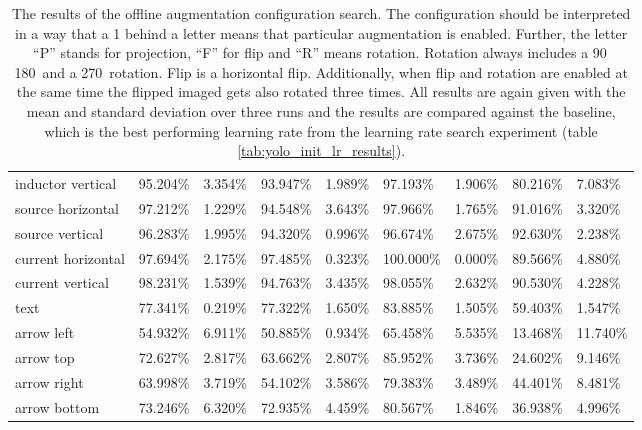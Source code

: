 \begin{table}[H]
\begin{center}
\begin{tabular}{|l|l|l|l|l|l|l|l|l|}
inductor vertical               & 95.204\% & 3.354\%  & 93.947\% & 1.989\%  &  97.193\%  & 1.906\% & 80.216\% & 7.083\%  \\
\rowcolor{lightgray!50}
source horizontal               & 97.212\% & 1.229\%  & 94.548\% & 3.643\%  &  97.966\%  & 1.765\% & 91.016\% & 3.320\%  \\
source vertical                 & 96.283\% & 1.995\%  & 94.320\% & 0.996\%  &  96.674\%  & 2.675\% & 92.630\% & 2.238\%  \\
\rowcolor{lightgray!50}
current horizontal              & 97.694\% & 2.175\%  & 97.485\% & 0.323\%  &  100.000\% & 0.000\% & 89.566\% & 4.880\%  \\
current vertical                & 98.231\% & 1.539\%  & 94.763\% & 3.435\%  &  98.055\%  & 2.632\% & 90.530\% & 4.228\%  \\
\rowcolor{lightgray!50}
text                            & 77.341\% & 0.219\%  & 77.322\% & 1.650\%  &  83.885\%  & 1.505\% & 59.403\% & 1.547\%  \\
arrow left                      & 54.932\% & 6.911\%  & 50.885\% & 0.934\%  &  65.458\%  & 5.535\% & 13.468\% & 11.740\% \\
\rowcolor{lightgray!50}
arrow top                       & 72.627\% & 2.817\%  & 63.662\% & 2.807\%  &  85.952\%  & 3.736\% & 24.602\% & 9.146\%  \\
arrow right                     & 63.998\% & 3.719\%  & 54.102\% & 3.586\%  &  79.383\%  & 3.489\% & 44.401\% & 8.481\%  \\
\rowcolor{lightgray!50}
arrow bottom                    & 73.246\% & 6.320\%  & 72.935\% & 4.459\%  &  80.567\%  & 1.846\% & 36.938\% & 4.996\%  \\
\hline

\end{tabular}
\caption{The results of the offline augmentation configuration search. The configuration should be interpreted in a way that a 1 behind a letter means that particular augmentation is enabled. Further, the letter ``P'' stands for projection, ``F'' for flip and ``R'' means rotation. Rotation always includes a 90\textdegree\, 180\textdegree\ and a 270\textdegree\ rotation. Flip is a horizontal flip. Additionally, when flip and rotation are enabled at the same time the flipped imaged gets also rotated three times. All results are again given with the mean and standard deviation over three runs and the results are compared against the baseline, which is the best performing learning rate from the learning rate search experiment (table \ref{tab:yolo_init_lr_results}).}
\label{tab:yolo_offline_aug_results}
\end{center}
\end{table}

